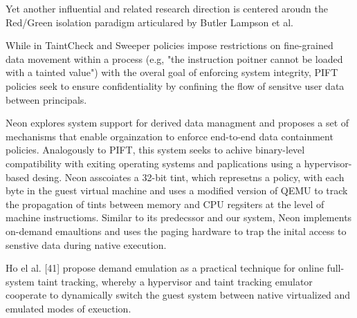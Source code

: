 Yet another influential and related research direction is centered aroudn the
Red/Green isolation paradigm articulared by Butler Lampson et al.

While in TaintCheck and Sweeper policies impose restrictions on fine-grained
data movement within a process (e.g, "the instruction poitner cannot be loaded
with a tainted value") with the overal goal of enforcing system
integrity, PIFT policies seek to ensure confidentiality by confining the flow
of sensitve user data between principals.

Neon explores system support for derived data managment and proposes a set of
mechanisms that enable orgainzation to enforce end-to-end data containment
policies.  Analogously to PIFT, this system seeks to achive binary-level
compatibility with exiting operating systems and paplications using a
hypervisor-based desing.  Neon asscoiates a 32-bit tint, which represetns a
policy, with each byte in the guest virtual machine and uses a modified version
of QEMU to track the propagation of tints between memory and CPU regsiters at
the level of machine instructioms.  Similar to its predecssor and our system,
Neon implements on-demand emaultions and uses the paging hardware to trap
the inital access to senstive data during native execution.

Ho el al. [41] propose demand emulation as a practical technique for online
full-system taint tracking, whereby a hypervisor and taint tracking emulator
cooperate to dynamically switch the guest system between native virtualized and
emulated modes of exeuction.




